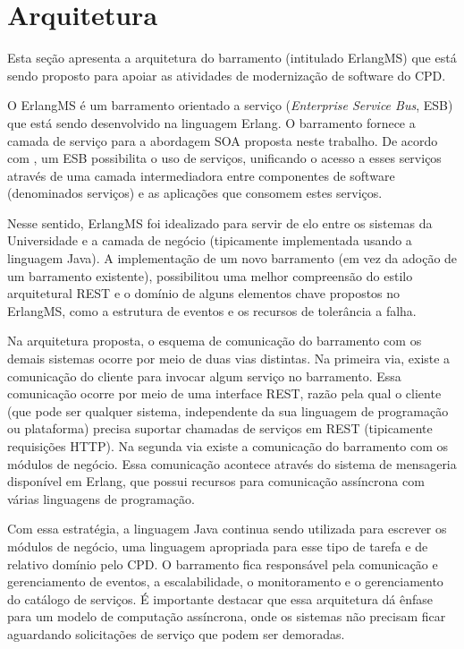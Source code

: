 \section{Arquitetura}\label{arquitetura}

Esta seção apresenta a arquitetura do barramento (intitulado ErlangMS) que está 
sendo proposto para apoiar as atividades de modernização 
de software do CPD. 

O ErlangMS é um barramento orientado a serviço (\textit{Enterprise Service Bus}, ESB) 
que est\'{a} sendo desenvolvido na linguagem Erlang. O barramento 
fornece a camada de serviço para a abordagem SOA proposta neste trabalho. De acordo 
com \cite{SOAPractice:2007}, um ESB possibilita o uso de serviços, unificando o acesso a esses serviços através de uma camada intermediadora entre componentes de software (denominados serviços) e as aplicações 
que consomem estes serviços.

Nesse sentido, ErlangMS foi idealizado para servir de elo entre os 
sistemas da Universidade e a camada de negócio (tipicamente 
implementada usando a linguagem Java). A implementa\c c\~{a}o 
de um novo barramento (em vez da ado\c c\~{a}o de um barramento existente), 
possibilitou uma melhor compreens\~{a}o do estilo arquitetural REST e o dom\'{i}nio de alguns 
elementos chave propostos no ErlangMS, como a estrutura de eventos e os recursos de toler\^{a}ncia 
a falha.

Na arquitetura proposta, o esquema de comunicação do barramento com os demais sistemas 
ocorre por meio de 
duas vias distintas. Na primeira via, existe a comunicação do cliente para 
invocar algum serviço no barramento. Essa comunicação ocorre por meio de uma 
interface REST, razão pela qual o cliente (que pode ser qualquer sistema, 
independente da sua linguagem de programação ou plataforma) 
precisa suportar chamadas de serviços em REST (tipicamente requisições HTTP). 
Na segunda via existe a comunicação 
do barramento com os módulos de negócio. Essa comunicação acontece através do sistema de mensageria 
disponível em Erlang, que possui recursos para comunicação assíncrona 
com várias linguagens de programação.

Com essa estratégia, a linguagem Java continua sendo utilizada para 
escrever os módulos de negócio, uma linguagem apropriada para esse 
tipo de tarefa e de relativo domínio pelo CPD. O barramento fica responsável pela 
comunicação e gerenciamento de eventos, a escalabilidade, o monitoramento 
e o gerenciamento do catálogo de serviços. 
É importante destacar que essa arquitetura dá ênfase para um modelo de 
computação assíncrona, onde os sistemas não precisam ficar aguardando 
solicitações de serviço que podem ser demoradas. 

